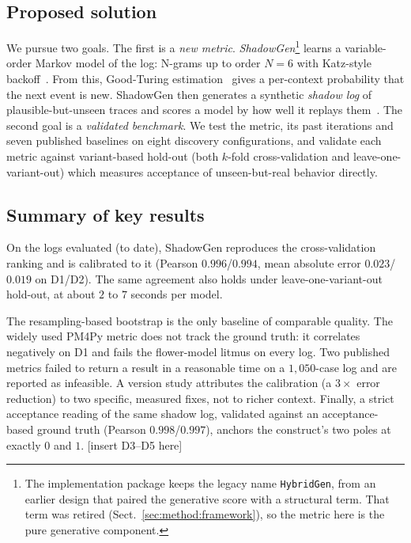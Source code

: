 \documentclass[runningheads]{llncs}
\begin{document}
\subsection{Proposed solution}
We pursue two goals. The first is a \emph{new metric}. \emph{ShadowGen}\footnote{The implementation package keeps the legacy name \texttt{HybridGen}, from an earlier design that paired the generative score with a structural term. That term was retired (Sect.~\ref{sec:method:framework}), so the metric here is the pure generative component.} learns a variable-order Markov model of the log: N-grams up to order $N{=}6$ with Katz-style backoff~\cite{katz1987}. From this, Good-Turing estimation~\cite{gale1995gt} gives a per-context probability that the next event is new. ShadowGen then generates a synthetic \emph{shadow log} of plausible-but-unseen traces and scores a model by how well it replays them~\cite{rozinat2008conformance}. The second goal is a \emph{validated benchmark}. We test the metric, its past iterations and seven published baselines on eight discovery configurations, and validate each metric against variant-based hold-out (both $k$-fold cross-validation and leave-one-variant-out) which measures acceptance of unseen-but-real behavior directly.

\subsection{Summary of key results}
On the logs evaluated (to date), ShadowGen reproduces the cross-validation ranking and is calibrated to it (Pearson $0.996$/$0.994$, mean absolute error $0.023$/$0.019$ on D1/D2). The same agreement also holds under leave-one-variant-out hold-out, at about $2$ to $7$ seconds per model.

The resampling-based bootstrap is the only baseline of comparable quality. The widely used PM4Py metric does not track the ground truth: it correlates negatively on D1 and fails the flower-model litmus on every log. Two published metrics failed to return a result in a reasonable time on a $1{,}050$-case log and are reported as infeasible. A version study attributes the calibration (a $3\times$ error reduction) to two specific, measured fixes, not to richer context. Finally, a strict acceptance reading of the same shadow log, validated against an acceptance-based ground truth (Pearson $0.998$/$0.997$), anchors the construct's two poles at exactly $0$ and $1$. [insert D3--D5 here]
\end{document}
